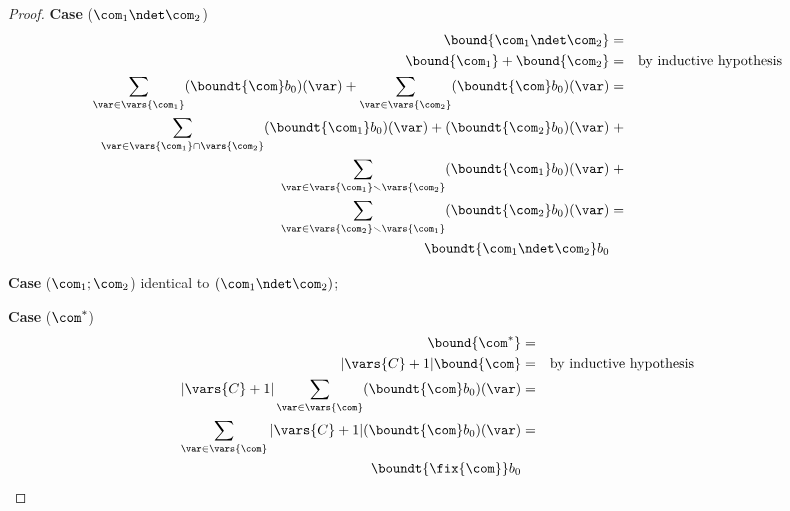 \begin{proof}
  \textbf{Case} (\(\com_1 \ndet \com_2\))
  \begin{align*}
    \bound{\com_1 \ndet \com_2} & = &\\
    \bound{\com_1} + \bound{\com_2} & = & \text{by inductive hypothesis}\\
      \sum_{\var\in \vars{\com_1}} (\boundt{\com}b_0)(\var) + \sum_{\var\in \vars{\com_2}} (\boundt{\com}b_0)(\var) & = &\\
    \sum_{\var\in \vars{\com_1}\cap \vars{\com_2}} (\boundt{\com_1}b_0)(\var)+(\boundt{\com_2}b_0)(\var) & \;+ & \\
    \sum_{\var\in \vars{\com_1}\smallsetminus \vars{\com_2}} (\boundt{\com_1}b_0)(\var) & \;+ & \\
    \sum_{\var\in \vars{\com_2}\smallsetminus \vars{\com_1}} (\boundt{\com_2}b_0)(\var) & = & \\
    \boundt{\com_1 \ndet \com_2}b_0 & &
  \end{align*}

  \medskip
  
  \textbf{Case} (\(\com_1 ; \com_2\))
  identical to \((\com_1 \ndet \com_2)\);

  \medskip
  
  \textbf{Case} (\(\com^*\))
  \begin{align*}
    \bound{\com^*} & = &\\
    |\vars{C}+1|\bound{\com} & = & \text{by inductive hypothesis} \\
    |\vars{C}+1|\sum_{\var\in \vars{\com}} (\boundt{\com}b_0)(\var) & = &\\
    \sum_{\var\in \vars{\com}} |\vars{C}+1|(\boundt{\com}b_0)(\var) & = &\\
      \boundt{\fix{\com}}b_0 & &
  \end{align*}
\end{proof}

